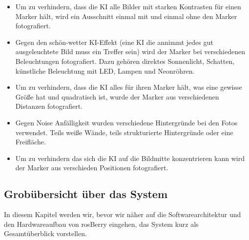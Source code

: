 \documentclass[conference]{IEEEtran}
\begin{document}
\begin{itemize}
	\item Um zu verhindern, dass die KI alle Bilder mit starken Kontrasten für einen Marker hält, wird ein Ausschnitt einmal mit und einmal ohne den Marker fotografiert.
	\item Gegen den \glqq schön-wetter KI\grqq-Effekt (eine KI die annimmt jedes gut ausgeleuchtete Bild muss ein Treffer sein) wird der Marker bei verschiedenen Beleuchtungen fotografiert.
	Dazu gehören direktes Sonnenlicht, Schatten, künstliche Beleuchtung mit LED, Lampen und Neonröhren. 
	\item Um zu verhindern, dass die KI alles für ihren Marker hält, was eine gewisse Größe hat und quadratisch ist, wurde der Marker aus verschiedenen Distanzen fotografiert. 
	\item Gegen Noise Anfälligkeit wurden verschiedene Hintergründe bei den Fotos verwendet. Teils weiße Wände, teils strukturierte Hintergründe oder eine Freifläche. 
	\item Um zu verhindern das sich die KI auf die Bildmitte konzentrieren kann wird der Marker aus verschieden Positionen fotografiert. 
\end{itemize}

\subsection{Grobübersicht über das System}
In diesem Kapitel werden wir, bevor wir näher auf die Softwarearchitektur und den Hardwareaufbau von rosBerry eingehen, das System kurz als Gesamtüberblick vorstellen.
\end{document}
